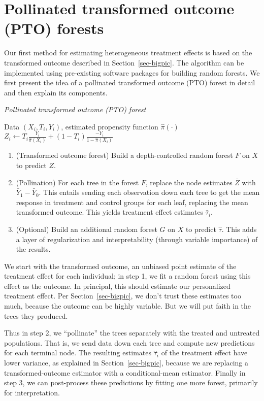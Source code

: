\documentclass{article}
\begin{document}
\section{Pollinated transformed outcome (PTO) forests}
\label{sec-pto}

Our first method for estimating heterogeneous treatment effects is based on the
transformed outcome described in Section~\ref{sec-bigpic}. The algorithm can be
implemented using pre-existing software packages for building random forests.
We first present the idea of a pollinated transformed outcome (PTO) forest
in detail and then explain its components.

\begin{algorithm}
\caption{\it Pollinated transformed outcome (PTO) forest}
\label{alg-pto-forest}
\begin{algorithmic}
  \REQUIRE Data $(X_i, T_i, Y_i)$, estimated propensity function
    $\hat\pi(\cdot)$
  \STATE $Z_i \gets T_i\frac{Y_i}{\hat\pi(X_i)} +
    (1 - T_i)\frac{-Y_i}{1 - \hat\pi(X_i)}$
  \begin{enumerate}
    \item (Transformed outcome forest) Build a depth-controlled random forest
      $F$ on $X$ to predict $Z$.
    \item (Pollination) For each tree in the forest $F$, replace the node
      estimates $\bar Z$ with $\bar Y_1 - \bar Y_0$. This entails sending each
      observation down each tree to get the mean response in treatment and
      control groups for each leaf, replacing the mean transformed outcome.
      This yields treatment effect estimates $\hat\tau_i$.
    \item (Optional) Build an additional random forest $G$ on $X$ to predict
      $\hat\tau$. This adds a layer of regularization and interpretability
      (through variable importance) of the results.
  \end{enumerate}
\end{algorithmic}
\end{algorithm}

We start with the transformed outcome, an unbiased point estimate of the
treatment effect for each individual; in step 1,
we fit a random forest using this effect as the outcome.
In principal, this should estimate our personalized treatment
effect. Per Section~\ref{sec-bigpic}, we don't trust these estimates too much,
because the outcome can be highly variable. But we will put faith in the trees
they produced. 

Thus in step 2, we ``pollinate'' the trees  separately with the treated and
untreated populations. That is, we send data down each tree and compute new
predictions for each terminal node. The resulting estimates $\hat\tau_i$ of the
treatment effect have lower variance, as explained in Section~\ref{sec-bigpic},
because we are replacing a transformed-outcome estimator with a
conditional-mean estimator. Finally in step 3, we can post-process these
predictions by fitting one more forest, primarily for interpretation.
\end{document}
